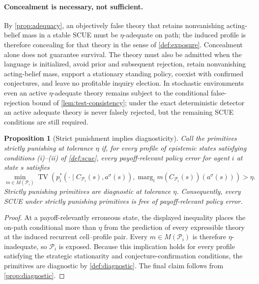 \documentclass[11pt]{article}
\newtheorem{proposition}[assumption]{Proposition}
\theoremstyle{definition}
\newcommand{\TV}{\operatorname{TV}}
\newcommand{\marg}[1]{\operatorname{marg}_{#1}}
\begin{document}
\paragraph{Concealment is necessary, not sufficient.}
By \cref{prop:adequacy}, an objectively false theory that retains nonvanishing acting-belief mass in a stable SCUE must be \(\eta\)-adequate on path; the induced profile is therefore concealing for that theory in the sense of \cref{def:exposure}.
Concealment alone does not guarantee survival.
The theory must also be admitted when the language is initialized, avoid prior and subsequent rejection, retain nonvanishing acting-belief mass, support a stationary standing policy, coexist with confirmed conjectures, and leave no profitable inquiry election.
In stochastic environments even an active \(\eta\)-adequate theory remains subject to the conditional false-rejection bound of \cref{lem:test-consistency}; under the exact deterministic detector an active adequate theory is never falsely rejected, but the remaining SCUE conditions are still required.

\begin{proposition}[Strict punishment implies diagnosticity]
\label{prop:punishing}
Call the primitives \emph{strictly punishing at tolerance \(\eta\)} if, for every profile of epistemic states satisfying conditions \emph{(i)}--\emph{(ii)} of \cref{def:scue}, every payoff-relevant policy error for agent \(i\) at state \(s\) satisfies
\[
\min_{m\in M(\mathcal P_i)}
\TV\!\left(
p_i^{*}\!\left(
\cdot\mid
C_{\mathcal P_i}(s),a^{\sigma}(s)
\right),
\marg{i}m(C_{\mathcal P_i}(s))(a^{\sigma}(s))
\right)
>
\eta.
\]
Strictly punishing primitives are diagnostic at tolerance \(\eta\).
Consequently, every SCUE under strictly punishing primitives is free of payoff-relevant policy error.
\end{proposition}

\begin{proof}
At a payoff-relevantly erroneous state, the displayed inequality places the on-path conditional more than \(\eta\) from the prediction of every expressible theory at the induced recurrent cell--profile pair.
Every \(m\in M(\mathcal P_i)\) is therefore \(\eta\)-inadequate, so \(\mathcal P_i\) is exposed.
Because this implication holds for every profile satisfying the strategic stationarity and conjecture-confirmation conditions, the primitives are diagnostic by \cref{def:diagnostic}.
The final claim follows from \cref{prop:diagnostic}.
\end{proof}
\end{document}
